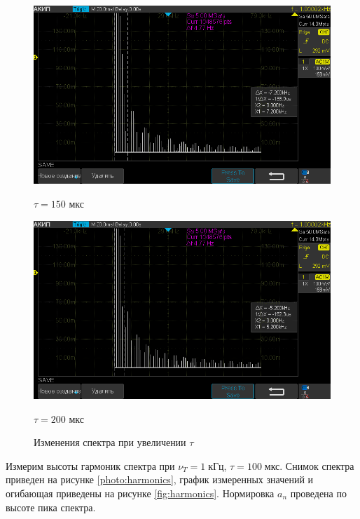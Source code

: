 \begin{figure}[H]
	\centering
	\begin{minipage}[b]{.5\textwidth}
		\centering
		\includegraphics[width=0.9\linewidth]{"../photos/impulse6.png"}
		\caption*{$\tau = 150$ мкс}
	\end{minipage}%
	\begin{minipage}[b]{.5\textwidth}
		\centering
		\includegraphics[width=0.9\linewidth]{"../photos/impulse7.png"}
		\caption*{$\tau = 200$ мкс}
	\end{minipage}
	\caption{Изменения спектра при увеличении $\tau$}
	\label{photo:impulse_tau}
\end{figure}

Измерим высоты гармоник спектра при $\nu_T = 1 \; \text{кГц}$, $\tau = 100 \; \text{мкс}$. Снимок спектра приведен на рисунке \ref{photo:harmonics}, график измеренных значений и огибающая приведены на рисунке \ref{fig:harmonics}. Нормировка $a_n$ проведена по высоте пика спектра.

